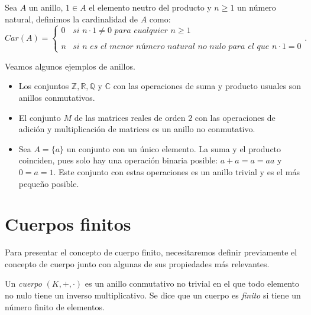 \begin{definition}
    Sea $A$ un anillo, $1 \in A$ el elemento neutro del producto y $n \geq 1$ un número natural, definimos la cardinalidad de $A$ como:
    \[
        Car(A) = \left\{ \begin{array}{lc}
        0 &   \textit{si } n \cdot 1 \neq 0 \textit{ para cualquier } n \geq 1 \\
        \\ n & \textit{si n es el menor número natural no nulo para el que } n \cdot 1 = 0
        \end{array}
        \right. .
    \]
\end{definition}


\begin{exampleth}
    Veamos algunos ejemplos de anillos.
    \begin{itemize}
        \item Los conjuntos $\mathbb{Z}, \mathbb{R}, \mathbb{Q}$ y $\mathbb{C}$ con las operaciones de suma y producto usuales son anillos conmutativos.
        \item El conjunto $M$ de las matrices reales de orden $2$ con las operaciones de adición y multiplicación de matrices es un anillo no conmutativo.
        \item Sea $A = \{ a \}$ un conjunto con un único elemento. La suma y el producto coinciden, pues solo hay una operación binaria posible: $a + a = a = aa$ y $0 = a = 1$. Este conjunto con estas operaciones es un anillo trivial y es el más pequeño posible.
    \end{itemize}
\end{exampleth}

\section{Cuerpos finitos}

Para presentar el concepto de cuerpo finito, necesitaremos definir previamente el concepto de cuerpo junto con algunas de sus propiedades más relevantes.

\begin{definition}
    Un \emph{cuerpo} $(K, +, \cdot)$ es un anillo conmutativo no trivial en el que todo elemento no nulo tiene un inverso multiplicativo. Se dice que un cuerpo es \emph{finito} si tiene un número finito de elementos.
\end{definition}


